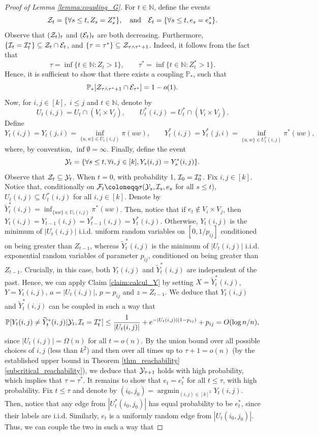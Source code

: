 \documentclass[11pt]{article}
\numberwithin{equation}{section}
\DeclareMathOperator{\argmin}{\mathrm{argmin}}
\theoremstyle{definition}
\newcommand\bN{{\mathbb N}}
\newcommand\bP{{\mathbb P}}
\newcommand\cE{{\cal{E}}}
\newcommand\cF{{\cal{F}}}
\newcommand\cI{{\cal{I}}}
\newcommand\cY{{\cal{Y}}}
\newcommand\cZ{{\cal{Z}}}
\newcommand{\wt}{\widetilde}
\begin{document}
\begin{proof}[Proof of Lemma \ref{lemma:coupling_G}]
For $t\in \bN$, define the events 
$$\cZ_t = \{\forall s \leq t, Z_s = Z^*_s\},\quad \textrm{and} \quad \cE_t = \{\forall s \leq t, e_s = e^*_s\}.$$
Observe that $(\cZ_t)_t$ and $(\cE_t)_t$ are both decreasing. Furthermore, $\{\cI_t = \cI^*_t \} \subseteq \cZ_t \cap \cE_t$, and $\{\tau = \tau^*\} \subseteq \cZ_{\tau \land \tau^* +1}$. Indeed, it follows from the fact that
\begin{equation*}
\tau = \inf \{t\in \bN : Z_t > 1\}, \quad \quad \tau^* = \inf\{t\in \bN : Z^*_t > 1 \}.
\end{equation*} 
Hence, it is sufficient to show that there exists a coupling $\bP_{*}$, such that
$$\bP_*[\cZ_{\tau \land \tau^* +1} \cap \cE_{\tau^*}] =  1-o(1).$$ 
Now, for $i,j \in [k],$ $i\leq j$ and $t\in \bN$, denote by 
$$U_t(i,j) = U_t \cap (V_i \times V_j), \quad \quad U^*_t(i,j) = U^*_t \cap (V_i \times V_j).$$ 
Define
$$ Y_t(i,j)= Y_t(j,i) = \inf_{ \{u,w\} \in U_t(i,j)}\pi(uw),\quad \quad Y^*_t(i,j) = Y^*_t(j,i) = \inf_{\{u,w\} \in U_t^*(i,j)}\pi^*(uw),$$
where, by convention, $\inf \emptyset = \infty$. Finally, define the event 
$$\cY_t = \{\forall s\leq t, \forall i,j \in [k], Y_s(i,j)=Y_s^*(i,j)\}.$$
Observe that $\cZ_t \subseteq \cY_t$. When $t=0$, with probability 1, $\cI_0 = \cI^*_0$. Fix $i,j \in [k]$. Notice that, conditionally on $\cF_t \coloneqq \sigma(\cY_s,\cI_s,e_s$ for all $s\leq t$), $U_t(i,j) \subseteq U^*_t(i,j)$ for all $i,j \in [k]$. Denote by $\wt{Y}^*_t(i,j) = \inf_{\{uw\} \in U_t(i,j)} \pi^*(uw)$. Then, notice that if $e_t \notin V_i\times V_j$, then $Y_t(i,j) = Y_{t-1}(i,j) =Y^*_{t-1}(i,j) = Y^*_{t}(i,j)$. Otherwise, $Y_t(i,j)$ is the minimum of $|U_t(i,j)|$ i.i.d. uniform random variables on $[0,1/p_{ij}]$ conditioned on being greater than $Z_{t-1}$, whereas $\wt{Y}^*_t(i,j)$ is the minimum of $|U_t(i,j)|$ i.i.d. exponential random variables of parameter $p_{ij}$, conditioned on being greater than $Z_{t-1}$. Crucially, in this case, both $Y_t(i,j)$ and $\wt{Y}_t^*(i,j)$ are independent of the past. Hence, we can apply Claim \ref{claim:calcul_Y} by setting $X = \wt{Y}_t^*(i,j)$, $Y=Y_t(i,j)$, $a = |U_t(i,j)|$, $p=p_{ij}$ and $z=Z_{t-1}$. We deduce that $Y_t(i,j)$ and $\wt{Y}_t^*(i,j)$ can be coupled in such a way that
$$ \bP[Y_t(i,j) \neq \wt{Y}^*_t(i,j) | \cY_t,\cI_t=\cI^*_t] \leq \frac{1}{|U_t(i,j)|}+ e^{-|U_t(i,j)|(1-p_{ij})}+p_{ij} = O(\log n/n),$$
since $|U_t(i,j)| = \Omega(n)$ for all $t=o(n)$. By the union bound over all possible choices of $i,j$ (less than $k^2$) and then over all times up to $\tau+1 = o(n)$ (by the established upper bound in Theorem \ref{thm_reachability}\ref{subcritical_reachability}), we deduce that $\cY_{\tau+1}$ holds with high probability, which implies that $\tau = \tau^*$. It remains to show that $e_t=e^*_t$ for all $t\leq \tau$, with high probability. Fix $t \leq \tau$ and denote by $(i_0,j_0) = \argmin_{(i,j)\in [k]^2} Y_t(i,j)$. Then, notice that any edge from $|U^*_t(i_0,j_0)|$ has equal probability to be $e^*_t$, since their labels are i.i.d. Similarly, $e_t$ is a uniformly random edge from $|U_t(i_0,j_0)|$. Thus, we can couple the two in such a way that 

\end{proof}
\end{document}
